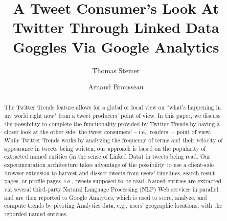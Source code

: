 \documentclass[runningheads,a4paper]{llncs}
\begin{document}
\mainmatter  %

\title{A Tweet Consumer's Look At Twitter Through Linked Data Goggles Via Google Analytics}


%
%
\author{Thomas Steiner \and Arnaud Brousseau}

%
%


\maketitle

\begin{abstract}
The Twitter Trends feature allows for a global or local view on ``what's happening in my world right now" from a tweet producers' point of view. In this paper, we discuss the possibility to complete the functionality provided by Twitter Trends by having a closer look at the other side: the tweet consumers' -- i.e., readers' -- point of view. While Twitter Trends works by analyzing the frequency of terms and their velocity of appearance in tweets being written, our approach is based on the popularity of extracted named entities (in the sense of Linked Data) in tweets being read. Our experimentation architecture takes advantage of the possibility to use a client-side browser extension to harvest and dissect tweets from users' timelines, search result pages, or profile pages, i.e., tweets supposed to be read. Named entities are extracted via several third-party Natural Language Processing (NLP) Web services in parallel, and are then reported to Google Analytics, which is used to store, analyze, and compute trends by pivoting Analytics data, e.g., users' geographic locations, with the reporded named entities.
\end{abstract}
\end{document}
